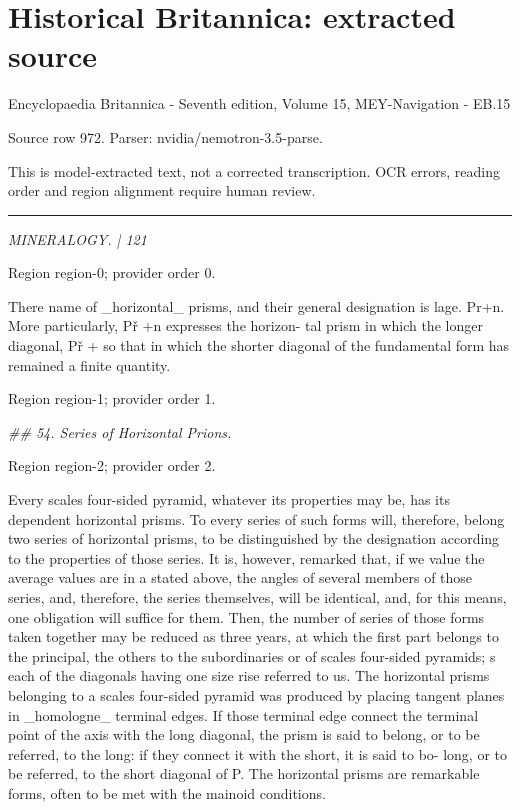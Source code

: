 \documentclass[11pt]{article}
\begin{document}
\section*{Historical Britannica: extracted source}
Encyclopaedia Britannica - Seventh edition, Volume 15, MEY-Navigation - EB.15\par
{\small Source row 972. Parser: nvidia/nemotron-3.5-parse.\par}
{\small This is model-extracted text, not a corrected transcription. OCR errors, reading order and region alignment require human review.\par}
\hrule\medskip
{\small\itshape MINERALOGY. | 121\par}

{\scriptsize\color{gray} Region region-0; provider order 0.\par}
\medskip

There name of \_horizontal\_ prisms, and their general designation is lage. Pr+n. More particularly, Př +n expresses the horizon- tal prism in which the longer diagonal, Př + so that in which the shorter diagonal of the fundamental form has remained a finite quantity.
\par

{\scriptsize\color{gray} Region region-1; provider order 1.\par}
\medskip

{\small\itshape \#\# 54. Series of Horizontal Prions.\par}

{\scriptsize\color{gray} Region region-2; provider order 2.\par}
\medskip

Every scales four-sided pyramid, whatever its properties may be, has its dependent horizontal prisms. To every series of such forms will, therefore, belong two series of horizontal prisms, to be distinguished by the designation according to the properties of those series. It is, however, remarked that, if we value the average values are in a stated above, the angles of several members of those series, and, therefore, the series themselves, will be identical, and, for this means, one obligation will suffice for them. Then, the number of series of those forms taken together may be reduced as three years, at which the first part belongs to the principal, the others to the subordinaries or of scales four-sided pyramids; s each of the diagonals having one size rise referred to us. The horizontal prisms belonging to a scales four-sided pyramid was produced by placing tangent planes in \_homologne\_ terminal edges. If those terminal edge connect the terminal point of the axis with the long diagonal, the prism is said to belong, or to be referred, to the long: if they connect it with the short, it is said to bo- long, or to be referred, to the short diagonal of P. The horizontal prisms are remarkable forms, often to be met with the mainoid conditions.
\par
\end{document}
